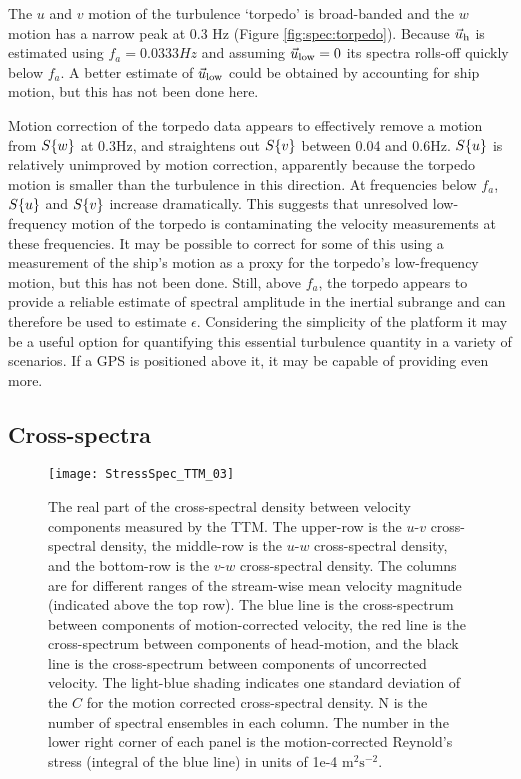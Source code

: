 The $u$ and $v$ motion of the turbulence `torpedo' is broad-banded and the $w$ motion has a narrow peak at 0.3 Hz (Figure \ref{fig:spec:torpedo}). Because $\vec{u}_\mathrm{h}$ is estimated using $f_a = 0.0333Hz$ and assuming $\vec{u}_\mathrm{low}=0$ its spectra rolls-off quickly below $f_a$. A better estimate of $\vec{u}_\mathrm{low}$ could be obtained by accounting for ship motion, but this has not been done here.


Motion correction of the torpedo data appears to effectively remove a motion from $S\{w\}$ at 0.3Hz, and straightens out $S\{v\}$ between 0.04 and 0.6Hz. $S\{u\}$ is relatively unimproved by motion correction, apparently because the torpedo motion is smaller than the turbulence in this direction. At frequencies below $f_a$, $S\{u\}$ and $S\{v\}$ increase dramatically. This suggests that unresolved low-frequency motion of the torpedo is contaminating the velocity measurements at these frequencies. It may be possible to correct for some of this using a measurement of the ship's motion as a proxy for the torpedo's low-frequency motion, but this has not been done. Still, above $f_a$, the torpedo appears to provide a reliable estimate of spectral amplitude in the inertial subrange and can therefore be used to estimate $\epsilon$. Considering the simplicity of the platform it may be a useful option for quantifying this essential turbulence quantity in a variety of scenarios. If a GPS is positioned above it, it may be capable of providing even more.

\subsection{Cross-spectra}

\begin{figure*}[t]
  \centering
  \texttt{[image: StressSpec\_TTM\_03]}
  \caption{The real part of the cross-spectral density between velocity components measured by the TTM. The upper-row is the $u$-$v$ cross-spectral density, the middle-row is the $u$-$w$ cross-spectral density, and the bottom-row is the $v$-$w$ cross-spectral density.  The columns are for different ranges of the stream-wise mean velocity magnitude (indicated above the top row). The blue line is the cross-spectrum between components of motion-corrected velocity, the red line is the cross-spectrum between components of head-motion, and the black line is the cross-spectrum between components of uncorrected velocity. The light-blue shading indicates one standard deviation of the $C$ for the motion corrected cross-spectral density. N is the number of spectral ensembles in each column. The number in the lower right corner of each panel is the motion-corrected Reynold's stress (integral of the blue line) in units of 1e-4 $\mathrm{m^2s^{-2}}$.}
  \label{fig:cspec:ttm}
\end{figure*}

